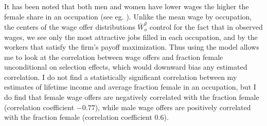 \documentclass[12pt]{article}
\begin{document}
It has been noted that both men and women have lower wages the higher the female share in an occupation (see eg. ). Unlike the mean wage by occupation, the centers of the wage offer distributions $\bar{W}^g_o $ control for the fact that in observed wages, we see only the most attractive jobs filled in each occupation, and by the workers that satisfy the firm's payoff maximization. Thus using the model allows me to look at the correlation between wage offers and fraction female unconditional on selection effects, which would downward bias any estimated correlation. I do not find a statistically significant correlation between my estimates of lifetime income and average fraction female in an occupation, but I do find that female wage offers are negatively correlated with the fraction female (correlation coefficient $-0.77$), while male wage offers are positively correlated with the fraction female (correlation coefficient $0.6$). 







\end{document}
